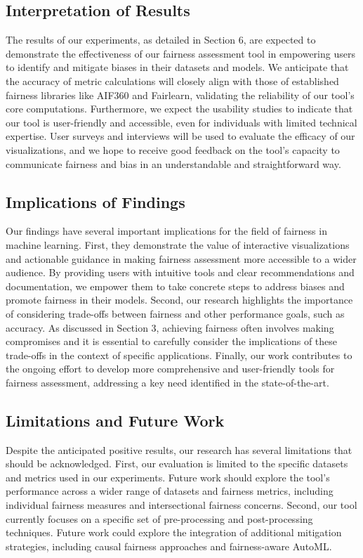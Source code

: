 \documentclass[runningheads]{llncs}
\begin{document}
\subsection{Interpretation of Results}
The results of our experiments, as detailed in Section 6, are expected to demonstrate the effectiveness of our fairness assessment tool in empowering users to identify and mitigate biases in their datasets and models. We anticipate that the accuracy of metric calculations will closely align with those of established fairness libraries like AIF360 and Fairlearn, validating the reliability of our tool's core computations. Furthermore, we expect the usability studies to indicate that our tool is user-friendly and accessible, even for individuals with limited technical expertise. User surveys and interviews will be used to evaluate the efficacy of our visualizations, and we hope to receive good feedback on the tool's capacity to communicate fairness and bias in an  understandable and straightforward way.

\subsection{Implications of Findings}
Our findings have several important implications for the field of fairness in machine learning. First, they demonstrate the value of interactive visualizations and actionable guidance in making fairness assessment more accessible to a wider audience. By providing users with intuitive tools and clear recommendations and documentation, we empower them to take concrete steps to address biases and promote fairness in their models. Second, our research highlights the importance of considering trade-offs between fairness and other performance goals, such as accuracy. As discussed in Section 3, achieving fairness often involves making compromises and it is essential to carefully consider the implications of these trade-offs in the context of specific applications. Finally, our work contributes to the ongoing effort to develop more comprehensive and user-friendly tools for fairness assessment, addressing a key need identified in the state-of-the-art.

\subsection{Limitations and Future Work}
Despite the anticipated positive results, our research has several limitations that should be acknowledged. First, our evaluation is limited to the specific datasets and metrics used in our experiments. Future work should explore the tool's performance across a wider range of datasets and fairness metrics, including individual fairness measures and intersectional fairness concerns. Second, our tool currently focuses on a specific set of pre-processing and post-processing techniques. Future work could explore the integration of additional mitigation strategies, including causal fairness approaches and fairness-aware AutoML.\\
\end{document}
